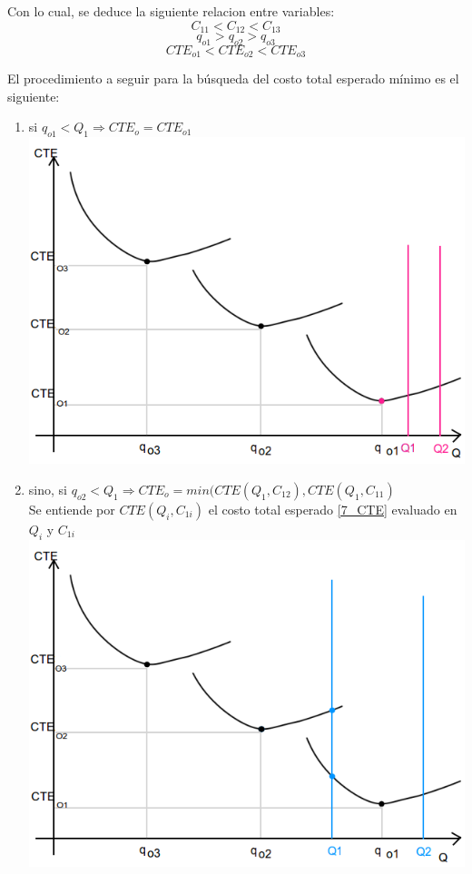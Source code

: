 \documentclass{article}
\begin{document}
Con lo cual, se deduce la siguiente relacion entre variables:
 $$ C_{11} < C_{12} < C_{13} $$
 $$ q_{o1} > q_{o2} > q_{o3}$$
 $$ CTE_{o1} < CTE_{o2} < CTE_{o3} $$
 
El procedimiento a seguir para la búsqueda del costo total esperado mínimo es el siguiente: 
\begin{enumerate}
 \item si $q_{o1} < Q_1 \Rightarrow CTE_o = CTE_{o1}$ \\
      \includegraphics[scale=0.5,keepaspectratio=true]{img/7/7_QvsCTE_1.png} 
 \item sino, si $ q_{o2} < Q_1 \Rightarrow CTE_o = min( CTE(Q_1, C_{12}), CTE(Q_1, C_{11})$ \\
       Se entiende por $CTE(Q_i, C_{1i})$ el costo total esperado \eqref{7_CTE} evaluado en $Q_i$ y $C_{1i}$ \\
      \includegraphics[scale=0.5,keepaspectratio=true]{img/7/7_QvsCTE_2.png} 

\end{enumerate}
\end{document}
